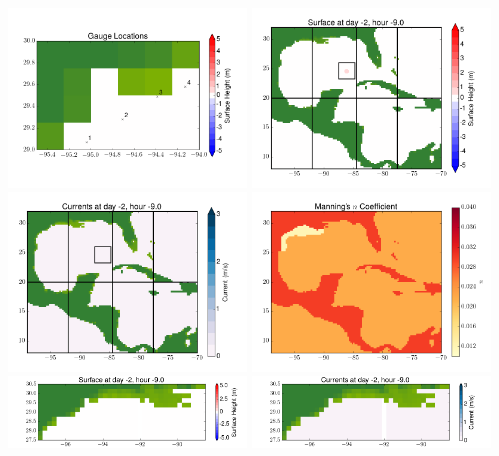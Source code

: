 \documentclass[11pt]{article}
\begin{document}
\includegraphics[width=0.475\textwidth]{frame0014fig10.png}
\vskip 10pt 
\includegraphics[width=0.475\textwidth]{frame0015fig1.png}
\includegraphics[width=0.475\textwidth]{frame0015fig2.png}
\vskip 10pt 
\includegraphics[width=0.475\textwidth]{frame0015fig3.png}
\includegraphics[width=0.475\textwidth]{frame0015fig4.png}
\vskip 10pt 
\includegraphics[width=0.475\textwidth]{frame0015fig5.png}
\end{document}

